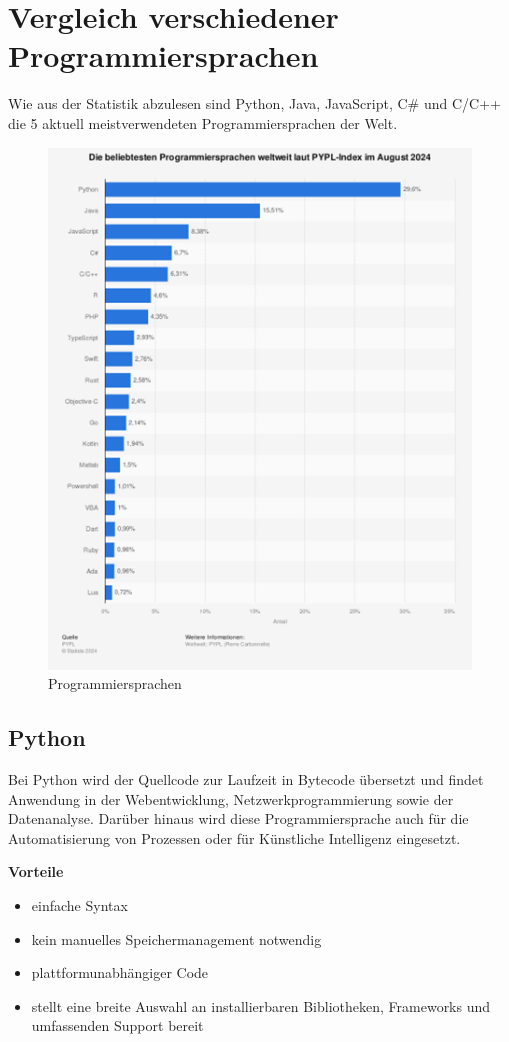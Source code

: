 \newpage
\section {Vergleich verschiedener Programmiersprachen}
Wie aus der Statistik abzulesen sind Python, Java, JavaScript, C\# und C/C++ die 5 aktuell meistverwendeten Programmiersprachen der Welt. \parencite{meistProgrammiersprachen}


\begin{figure}[H]
	\centering
	\includegraphics[width=0.7\linewidth]{images/Programmiersprachen.png}
	\caption[Programmiersprachen]{Programmiersprachen}
	\label{fig:Programmiersprachen}
\end{figure}

\newpage
\subsection{Python}
Bei Python wird der Quellcode zur Laufzeit in Bytecode übersetzt und findet Anwendung in der Webentwicklung, Netzwerkprogrammierung sowie der Datenanalyse. Darüber hinaus wird diese Programmiersprache auch für die Automatisierung von Prozessen oder für Künstliche Intelligenz eingesetzt. \parencite{Programmiersprachen}


\textbf{Vorteile}
\begin{itemize}
	\item einfache Syntax
	\item kein manuelles Speichermanagement notwendig
	\item plattformunabhängiger Code
	\item stellt eine breite Auswahl an installierbaren Bibliotheken, Frameworks und umfassenden Support bereit
\end{itemize}

